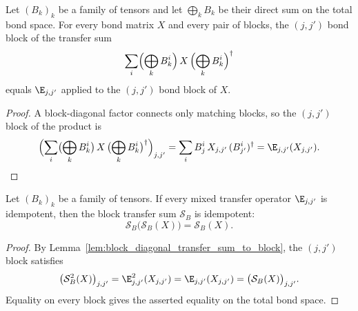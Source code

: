 \begin{lemma}%
    \label{lem:block_diagonal_transfer_sum_to_block}
    \leanok
    Let $(B_k)_k$ be a family of tensors and let $\bigoplus_k B_k$ be their
    direct sum on the total bond space. For every bond matrix $X$ and every pair
    of blocks, the $(j,j')$ bond block of the transfer sum
    \[
        \sum_i \Bigl(\bigoplus_k B_k^i\Bigr)\,X\,
            \Bigl(\bigoplus_k B_k^i\Bigr)^\dagger
    \]
    equals $\E_{j,j'}$ applied to the $(j,j')$ bond block of $X$.
\end{lemma}
\begin{proof}\leanok
    A block-diagonal factor connects only matching blocks, so the $(j,j')$ block
    of the product is
    \[
        \Bigl(\sum_i \bigl(\bigoplus_k B_k^i\bigr)\,X\,
            \bigl(\bigoplus_k B_k^i\bigr)^\dagger\Bigr)_{j,j'}
        = \sum_i B_j^i\,X_{j,j'}\,(B_{j'}^i)^\dagger
        = \E_{j,j'}(X_{j,j'}) .
    \]
\end{proof}

\begin{lemma}%
    \label{lem:block_transfer_sum_idempotent_of_pairwise_mixed}
    \leanok
    Let $(B_k)_k$ be a family of tensors. If every mixed transfer operator
    $\E_{j,j'}$ is idempotent, then the block transfer sum $\mathcal S_B$ is
    idempotent:
    \[
        \mathcal S_B\bigl(\mathcal S_B(X)\bigr)=\mathcal S_B(X).
    \]
\end{lemma}
\begin{proof}\leanok
    By Lemma~\ref{lem:block_diagonal_transfer_sum_to_block}, the $(j,j')$
    block satisfies
    \[
        \bigl(\mathcal S_B^2(X)\bigr)_{j,j'}
        = \E_{j,j'}^2(X_{j,j'})
        = \E_{j,j'}(X_{j,j'})
        = \bigl(\mathcal S_B(X)\bigr)_{j,j'}.
    \]
    Equality on every block gives the asserted equality on the total bond
    space.
\end{proof}

